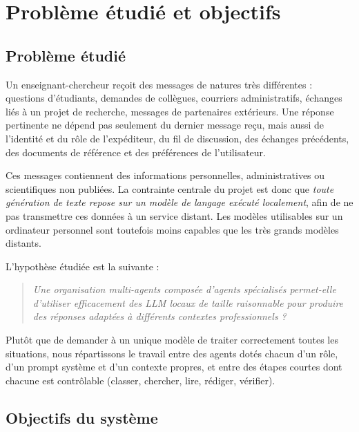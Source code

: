 \section{Problème étudié et objectifs}

\subsection{Problème étudié}

Un enseignant-chercheur reçoit des messages de natures très différentes : questions d'étudiants, demandes de collègues, courriers administratifs, échanges liés à un projet de recherche, messages de partenaires extérieurs. Une réponse pertinente ne dépend pas seulement du dernier message reçu, mais aussi de l'identité et du rôle de l'expéditeur, du fil de discussion, des échanges précédents, des documents de référence et des préférences de l'utilisateur.

Ces messages contiennent des informations personnelles, administratives ou scientifiques non publiées. La contrainte centrale du projet est donc que \emph{toute génération de texte repose sur un modèle de langage exécuté localement}, afin de ne pas transmettre ces données à un service distant. Les modèles utilisables sur un ordinateur personnel sont toutefois moins capables que les très grands modèles distants.

L'hypothèse étudiée est la suivante :

\begin{quote}
\emph{Une organisation multi-agents composée d'agents spécialisés permet-elle d'utiliser efficacement des LLM locaux de taille raisonnable pour produire des réponses adaptées à différents contextes professionnels ?}
\end{quote}

Plutôt que de demander à un unique modèle de traiter correctement toutes les situations, nous répartissons le travail entre des agents dotés chacun d'un rôle, d'un prompt système et d'un contexte propres, et entre des étapes courtes dont chacune est contrôlable (classer, chercher, lire, rédiger, vérifier).

\subsection{Objectifs du système}

